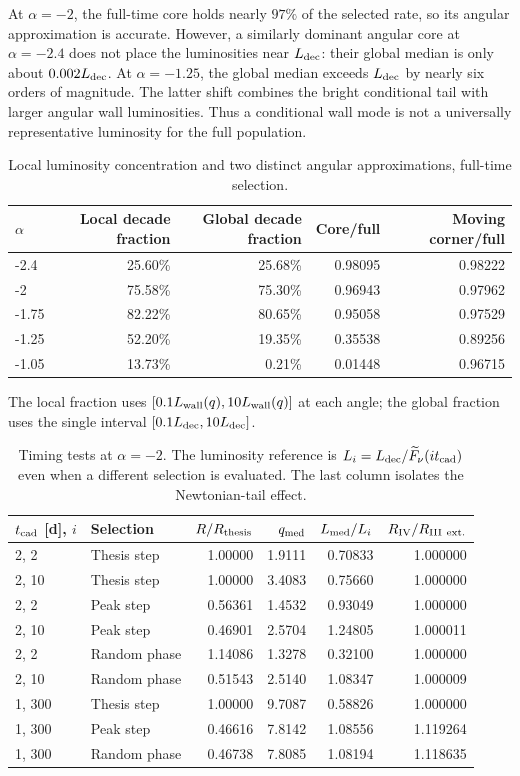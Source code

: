 At $\alpha=-2$, the full-time core holds nearly $97\%$ of the selected
rate, so its angular approximation is accurate. However, a similarly dominant
angular core at $\alpha=-2.4$ does not place the luminosities near $L_{\rm dec}$:
their global median is only about $0.002L_{\rm dec}$. At $\alpha=-1.25$,
the global median exceeds $L_{\rm dec}$ by nearly six orders of magnitude.
The latter shift combines the bright conditional tail with larger angular wall
luminosities. Thus a conditional wall mode is not a universally representative
luminosity for the full population.
\begin{table}[H]\centering\small
\renewcommand{\arraystretch}{1.15}
\caption{Local luminosity concentration and two distinct angular approximations, full-time selection.}
\begin{tabular}{@{}lrrrr@{}}
\toprule
$\alpha$ & Local decade fraction & Global decade fraction & Core/full & Moving corner/full \\\midrule
-2.4 & 25.60\% & 25.68\% & 0.98095 & 0.98222 \\
-2 & 75.58\% & 75.30\% & 0.96943 & 0.97962 \\
-1.75 & 82.22\% & 80.65\% & 0.95058 & 0.97529 \\
-1.25 & 52.20\% & 19.35\% & 0.35538 & 0.89256 \\
-1.05 & 13.73\% & 0.21\% & 0.01448 & 0.96715 \\
\bottomrule\end{tabular}\end{table}
The local fraction uses $[0.1L_{\rm wall}(q),10L_{\rm wall}(q)]$ at each angle; the global fraction uses the single interval $[0.1L_{\rm dec},10L_{\rm dec}]$.
\begin{table}[H]\centering\small
\renewcommand{\arraystretch}{1.15}
\caption{Timing tests at $\alpha=-2$. The luminosity reference is $L_i=L_{\rm dec}/\widetilde F_\nu(i t_{\rm cad})$ even when a different selection is evaluated. The last column isolates the Newtonian-tail effect.}
\begin{tabular}{@{}llrrrr@{}}
\toprule
$t_{\rm cad}$ [d], $i$ & Selection & $R/R_{\rm thesis}$ & $q_{\rm med}$ & $L_{\rm med}/L_i$ & $R_{\rm IV}/R_{\rm III\ ext.}$ \\\midrule
2, 2 & Thesis step & 1.00000 & 1.9111 & 0.70833 & 1.000000 \\
2, 10 & Thesis step & 1.00000 & 3.4083 & 0.75660 & 1.000000 \\
2, 2 & Peak step & 0.56361 & 1.4532 & 0.93049 & 1.000000 \\
2, 10 & Peak step & 0.46901 & 2.5704 & 1.24805 & 1.000011 \\
2, 2 & Random phase & 1.14086 & 1.3278 & 0.32100 & 1.000000 \\
2, 10 & Random phase & 0.51543 & 2.5140 & 1.08347 & 1.000009 \\
1, 300 & Thesis step & 1.00000 & 9.7087 & 0.58826 & 1.000000 \\
1, 300 & Peak step & 0.46616 & 7.8142 & 1.08556 & 1.119264 \\
1, 300 & Random phase & 0.46738 & 7.8085 & 1.08194 & 1.118635 \\
\bottomrule\end{tabular}\end{table}

